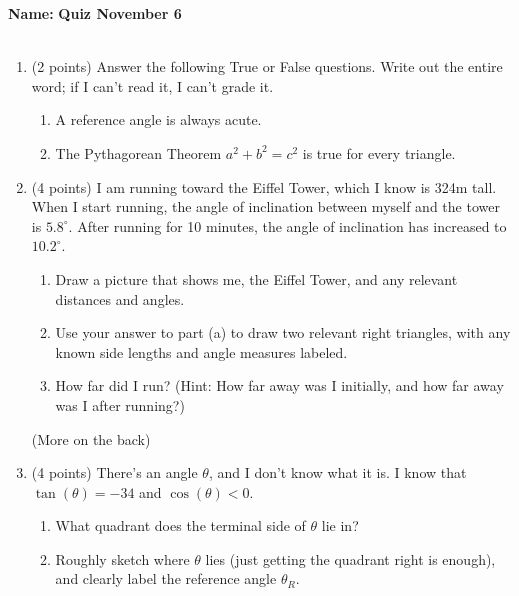 \documentclass{article}
\begin{document}
\noindent \textbf{Name:}\underline{\hspace{2in}} \hfill \textbf{Quiz November 6}
\\ \\

\begin{enumerate}
\item (2 points) Answer the following True or False questions. Write out the entire word; if I can't read it, I can't grade it.
  \begin{enumerate}
    \setlength\itemsep{2em}
  \item \underline{\hspace{1in}} A reference angle is always acute.
  \item \underline{\hspace{1in}} The Pythagorean Theorem $a^2 + b^2 = c^2$ is true for every triangle.
  \end{enumerate}
  \vspace{0.2in}
\item (4 points) I am running toward the Eiffel Tower, which I know is 324m tall. When I start running, the angle of inclination between myself and the tower is $5.8^\circ$. After running for 10 minutes, the angle of inclination has increased to $10.2^\circ$.
  \begin{enumerate}
  \item Draw a picture that shows me, the Eiffel Tower, and any relevant distances and angles.
    \vspace{2in}
  \item Use your answer to part (a) to draw two relevant right triangles, with any known side lengths and angle measures labeled.
    \vspace{2in}
  \item How far did I run? (Hint: How far away was I initially, and how far away was I after running?)
    \vspace{1.5in}
  \end{enumerate}
  \vfill
  \hfill (More on the back)
  \newpage
\item (4 points) There's an angle $\theta$, and I don't know what it is. I know that $\tan(\theta) = - 34$ and $\cos(\theta) < 0$.
  \begin{enumerate}
  \item What quadrant does the terminal side of $\theta$ lie in?
    \vspace{0.5in}
  \item Roughly sketch where $\theta$ lies (just getting the quadrant right is enough), and clearly label the reference angle $\theta_R$.

\end{enumerate}
\end{enumerate}
\end{document}
